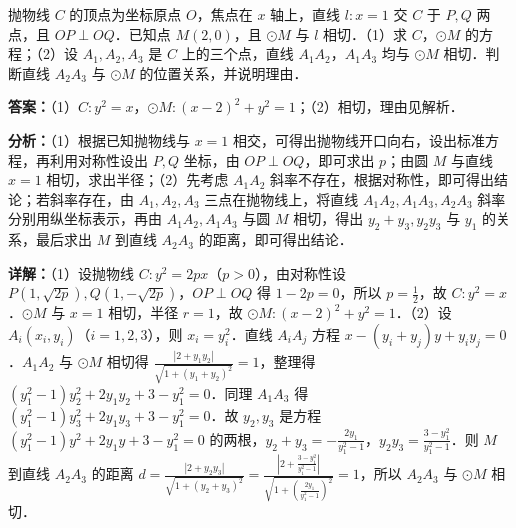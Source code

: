 \begin{question}[points=12]
抛物线 $C$ 的顶点为坐标原点 $O$，焦点在 $x$ 轴上，直线 $l: x=1$ 交 $C$ 于 $P, Q$ 两点，且 $OP \perp OQ$．已知点 $M(2,0)$，且 $\odot M$ 与 $l$ 相切．（1）求 $C$，$\odot M$ 的方程；（2）设 $A_1, A_2, A_3$ 是 $C$ 上的三个点，直线 $A_1A_2$，$A_1A_3$ 均与 $\odot M$ 相切．判断直线 $A_2A_3$ 与 $\odot M$ 的位置关系，并说明理由．
\begin{solution}
\textbf{答案：}（1）$C: y^2 = x$，$\odot M: (x-2)^2 + y^2 = 1$；（2）相切，理由见解析．

\textbf{分析：}（1）根据已知抛物线与 $x=1$ 相交，可得出抛物线开口向右，设出标准方程，再利用对称性设出 $P, Q$ 坐标，由 $OP \perp OQ$，即可求出 $p$；由圆 $M$ 与直线 $x=1$ 相切，求出半径；（2）先考虑 $A_1A_2$ 斜率不存在，根据对称性，即可得出结论；若斜率存在，由 $A_1, A_2, A_3$ 三点在抛物线上，将直线 $A_1A_2, A_1A_3, A_2A_3$ 斜率分别用纵坐标表示，再由 $A_1A_2, A_1A_3$ 与圆 $M$ 相切，得出 $y_2+y_3, y_2y_3$ 与 $y_1$ 的关系，最后求出 $M$ 到直线 $A_2A_3$ 的距离，即可得出结论．

\textbf{详解：}（1）设抛物线 $C: y^2 = 2px$（$p>0$），由对称性设 $P(1, \sqrt{2p}), Q(1, -\sqrt{2p})$，$OP \perp OQ$ 得 $1-2p=0$，所以 $p=\frac{1}{2}$，故 $C: y^2 = x$．$\odot M$ 与 $x=1$ 相切，半径 $r=1$，故 $\odot M: (x-2)^2 + y^2 = 1$．（2）设 $A_i(x_i, y_i)$（$i=1,2,3$），则 $x_i = y_i^2$．直线 $A_iA_j$ 方程 $x - (y_i+y_j)y + y_i y_j = 0$．$A_1A_2$ 与 $\odot M$ 相切得 $\frac{|2 + y_1y_2|}{\sqrt{1+(y_1+y_2)^2}} = 1$，整理得 $(y_1^2-1)y_2^2 + 2y_1 y_2 + 3 - y_1^2 = 0$．同理 $A_1A_3$ 得 $(y_1^2-1)y_3^2 + 2y_1 y_3 + 3 - y_1^2 = 0$．故 $y_2, y_3$ 是方程 $(y_1^2-1)y^2 + 2y_1 y + 3 - y_1^2 = 0$ 的两根，$y_2+y_3 = -\frac{2y_1}{y_1^2-1}$，$y_2y_3 = \frac{3-y_1^2}{y_1^2-1}$．则 $M$ 到直线 $A_2A_3$ 的距离 $d = \frac{|2 + y_2y_3|}{\sqrt{1+(y_2+y_3)^2}} = \frac{\left|2+\frac{3-y_1^2}{y_1^2-1}\right|}{\sqrt{1+\left(\frac{2y_1}{y_1^2-1}\right)^2}} = 1$，所以 $A_2A_3$ 与 $\odot M$ 相切．
\end{solution}
\end{question}

